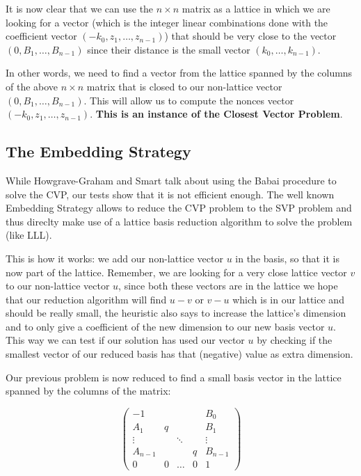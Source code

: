 \documentclass[a4paper,11pt]{article}
\begin{document}
It is now clear that we can use the $n \times n$ matrix as a lattice in which we are looking for a vector (which is the integer linear combinations done with the coefficient vector $(-k_0, z_1, \hdots, z_{n-1})$) that should be very close to the vector $(0, B_1 , \hdots, B_{n-1})$ since their distance is the small vector $(k_0, \hdots, k_{n-1})$.

In other words, we need to find a vector from the lattice spanned by the columns of the above $n \times n$ matrix that is closed to our non-lattice vector $(0, B_1 , \hdots, B_{n-1})$. This will allow us to compute the nonces vector $(-k_0, z_1, \hdots, z_{n-1})$. \textbf{This is an instance of the Closest Vector Problem}.

\subsection{The Embedding Strategy}

While Howgrave-Graham and Smart talk about using the Babai procedure to solve the CVP, our tests show that it is not efficient enough. The well known Embedding Strategy allows to reduce the CVP problem to the SVP problem and thus direclty make use of a lattice basis reduction algorithm to solve the problem (like LLL).

This is how it works: we add our non-lattice vector $u$ in the basis, so that it is now part of the lattice. Remember, we are looking for a very close lattice vector $v$ to our non-lattice vector $u$, since both these vectors are in the lattice we hope that our reduction algorithm will find $u - v$ or $v - u$ which is in our lattice and should be really small, the heuristic also says to increase the lattice's dimension and to only give a coefficient of the new dimension to our new basis vector $u$. This way we can test if our solution has used our vector $u$ by checking if the smallest vector of our reduced basis has that (negative) value as extra dimension.

Our previous problem is now reduced to find a small basis vector in the lattice spanned by the columns of the matrix:

$$
\begin{pmatrix}
-1 & & & & B_0\\
A_1 & q & & & B_1 \\
\vdots & & \ddots & &\vdots \\
A_{n-1} & & & q & B_{n-1}\\
0 & 0 & \hdots & 0 & 1
\end{pmatrix}
$$
\end{document}
